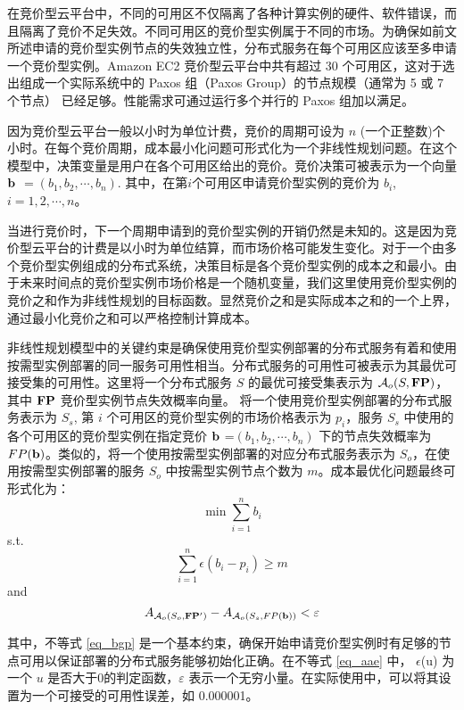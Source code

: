在竞价型云平台中，不同的可用区不仅隔离了各种计算实例的硬件、软件错误，而且隔离了竞价不足失效。不同可用区的竞价型实例属于不同的市场。为确保如前文所述申请的竞价型实例节点的失效独立性，分布式服务在每个可用区应该至多申请一个竞价型实例。Amazon EC2 竞价型云平台中共有超过 30 个可用区，这对于选出组成一个实际系统中的 Paxos 组（Paxos Group）的节点规模（通常为 5 或 7 个节点）\cite{Burrows:2006:CLS:1298455.1298487} 已经足够。性能需求可通过运行多个并行的 Paxos 组加以满足。

因为竞价型云平台一般以小时为单位计费，竞价的周期可设为 $n$ (一个正整数)个小时。在每个竞价周期，成本最小化问题可形式化为一个非线性规划问题。在这个模型中，决策变量是用户在各个可用区给出的竞价。竞价决策可被表示为一个向量 $\bf b$ $= (b_1, b_2, \cdots, b_n)$. 其中，在第$i$个可用区申请竞价型实例的竞价为 $b_i$, $i = 1, 2, \cdots, n$。

当进行竞价时，下一个周期申请到的竞价型实例的开销仍然是未知的。这是因为竞价型云平台的计费是以小时为单位结算，而市场价格可能发生变化。对于一个由多个竞价型实例组成的分布式系统，决策目标是各个竞价型实例的成本之和最小。由于未来时间点的竞价型实例市场价格是一个随机变量，我们这里使用竞价型实例的竞价之和作为非线性规划的目标函数。显然竞价之和是实际成本之和的一个上界，通过最小化竞价之和可以严格控制计算成本。

非线性规划模型中的关键约束是确保使用竞价型实例部署的分布式服务有着和使用按需型实例部署的同一服务可用性相当。分布式服务的可用性可被表示为其最优可接受集的可用性。这里将一个分布式服务 $S$ 的最优可接受集表示为 $\mathcal{A}_{o}(S, \bf{FP})$，其中 $\bf{FP}$ 竞价型实例节点失效概率向量。 将一个使用竞价型实例部署的分布式服务表示为 $S_s$, 第 $i$ 个可用区的竞价型实例的市场价格表示为 $p_i$，服务 $S_s$ 中使用的各个可用区的竞价型实例在指定竞价 $\bf b$ =$ (b_1, b_2, \cdots, b_n)$ 下的节点失效概率为 $FP(\bf b)$。类似的，将一个使用按需型实例部署的对应分布式服务表示为 $S_o$，在使用按需型实例部署的服务 $S_o$ 中按需型实例节点个数为 $m$。成本最优化问题最终可形式化为：
\begin{equation}
\min \sum_{i=1}^n b_i
\end{equation}
s.t.
\begin{equation}\label{eq_bgp}
\sum_{i=1}^n {\epsilon(b_i - p_i)} \geq m
\end{equation}
and
\begin{equation}\label{eq_aae}
A_{\mathcal{A}_{o}(S_o, {\bf{FP^{\prime}}})} - A_{\mathcal{A}_{o}(S_s, FP(\bf b))} < \varepsilon
\end{equation}

其中，不等式 \eqref{eq_bgp} 是一个基本约束，确保开始申请竞价型实例时有足够的节点可用以保证部署的分布式服务能够初始化正确。在不等式 \eqref{eq_aae} 中， $\epsilon$(u) 为一个 $u$ 是否大于0的判定函数，$\varepsilon$ 表示一个无穷小量。在实际使用中，可以将其设置为一个可接受的可用性误差，如 0.000001。

